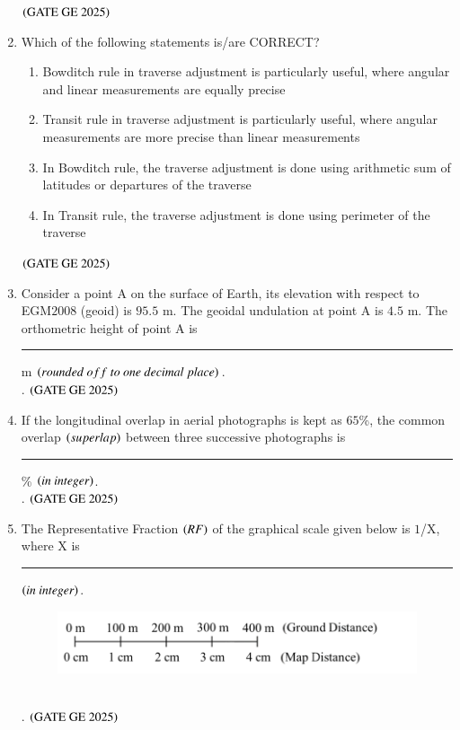 \documentclass[journal,12pt,onecolumn]{IEEEtran}
\theoremstyle{remark}
\begin{document}
\begin{enumerate}
\begin{enumerate}
\end{enumerate}
\hfill $\left(\text{GATE GE 2025}\right)$
\bigskip
\item Which of the following statements is/are CORRECT?
\begin{enumerate}
\item Bowditch rule in traverse adjustment is particularly useful, where angular and linear measurements are equally precise
\item Transit rule in traverse adjustment is particularly useful, where angular measurements are more precise than linear measurements
\item In Bowditch rule, the traverse adjustment is done using arithmetic sum of latitudes or departures of the traverse
\item In Transit rule, the traverse adjustment is done using perimeter of the traverse
\end{enumerate}
\hfill $\left(\text{GATE GE 2025}\right)$
\bigskip
\item Consider a point A on the surface of Earth, its elevation with respect to EGM$2008$ (geoid) is $95.5$ m.
The geoidal undulation at point A is $4.5$ m. The orthometric height of point A is \rule{2cm}{0.5mm} m $\brak{rounded\ off\ to\ one\ decimal\ place}$.\\.
\hfill $\left(\text{GATE GE 2025}\right)$
\bigskip
\item If the longitudinal overlap in aerial photographs is kept as $65$\%, the common overlap $\left(superlap\right)$ between three successive photographs is \rule{2cm}{0.5mm} \% $\left(in\ integer\right)$.\\.
\hfill $\left(\text{GATE GE 2025}\right)$
\bigskip
\item The Representative Fraction $\left(RF\right)$ of the graphical scale given below is $1$/X, where X is \rule{2cm}{0.5mm} $\left(in\ integer\right)$.
\begin{figure}[H]
    \centering
    \includegraphics[width=0.7\columnwidth]{figs/fig8.png}
    \caption{}
    \label{figs:fig8}
\end{figure}\\.
\hfill $\left(\text{GATE GE 2025}\right)$
\bigskip


\end{enumerate}
\end{document}
